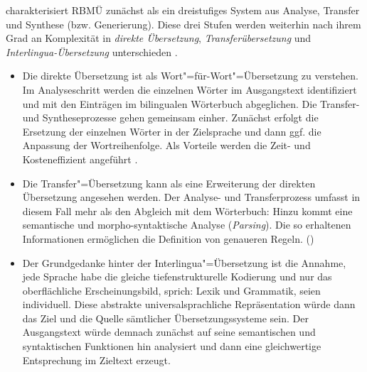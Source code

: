 \citet[8]{stein_maschinelle_2009} charakterisiert RBMÜ zunächst als ein dreistufiges System aus \glqq Analyse, Transfer und Synthese (bzw. Generierung)\grqq{}. Diese drei Stufen werden weiterhin nach ihrem Grad an Komplexität in \emph{direkte Übersetzung}, \emph{Transferübersetzung} und \emph{Interlingua-Übersetzung} unterschieden \citep[8]{stein_maschinelle_2009}.

\begin{itemize}

	
    \item Die direkte Übersetzung ist als Wort"=für-Wort"=Übersetzung zu verstehen. Im Analyseschritt werden die einzelnen Wörter im Ausgangstext identifiziert und mit den Einträgen im bilingualen Wörterbuch abgeglichen. Die Transfer- und Syntheseprozesse gehen gemeinsam einher. Zunächst erfolgt die Ersetzung der einzelnen Wörter in der Zielsprache und dann ggf. die Anpassung der Wortreihenfolge. Als Vorteile werden die Zeit- und Kosteneffizient angeführt \citep[645\psq]{carstensen_computerlinguistik_2010}.
	
    \item Die Transfer"=Übersetzung kann als eine Erweiterung der direkten Übersetzung angesehen werden. Der Analyse- und Transferprozess umfasst in diesem Fall mehr als den Abgleich mit dem Wörterbuch: Hinzu kommt eine semantische und morpho-syntaktische Analyse (\emph{Parsing}). Die so erhaltenen Informationen ermöglichen die Definition von genaueren Regeln. (\cites[8]{stein_maschinelle_2009}[646]{carstensen_computerlinguistik_2010})
   
  	\item \label{K3:item:interlingua} Der Grundgedanke hinter der Interlingua"=Übersetzung ist die Annahme, jede Sprache habe die gleiche tiefenstrukturelle Kodierung und nur das oberflächliche Erscheinungsbild, sprich: Lexik und Grammatik, seien individuell. \glqq Diese abstrakte universalsprachliche Repräsentation würde dann das Ziel und die Quelle sämtlicher Übersetzungssysteme sein.\grqq{} \citep[8]{stein_maschinelle_2009} Der Ausgangstext würde demnach zunächst auf seine semantischen und syntaktischen Funktionen hin analysiert und dann eine gleichwertige Entsprechung im Zieltext erzeugt.

\end{itemize}




